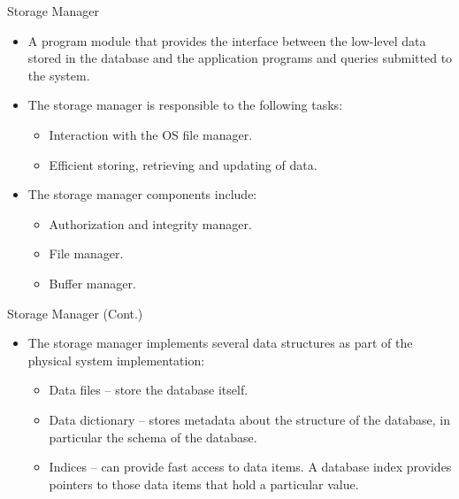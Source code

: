 \documentclass[aspectratio=169]{beamer}
\begin{document}
\begin{frame}{Storage Manager}
    \begin{itemize}
        \item A program module that provides the interface between the low-level data stored in the database and the application programs and queries submitted to the system.
        \item The storage manager is responsible to the following tasks: 
        \begin{itemize}
            \item Interaction with the OS file manager.
            \item Efficient storing, retrieving and updating of data.
        \end{itemize}
        \item The storage manager components include:
        \begin{itemize}
            \item Authorization and integrity manager.
            \item File manager.
            \item Buffer manager.
        \end{itemize}
    \end{itemize}
\end{frame}

\begin{frame}{Storage Manager (Cont.)}
    \begin{itemize}
        \item The storage manager implements several data structures as part of the physical system implementation:
        \begin{itemize}
            \item Data files -- store the database itself.
            \item Data dictionary --  stores metadata about the structure of the database, in particular the schema of the database.
            \item Indices --  can provide fast access to data items.  A database index provides pointers to those data items that hold a particular value.
        \end{itemize}
    \end{itemize}
\end{frame}
\end{document}
